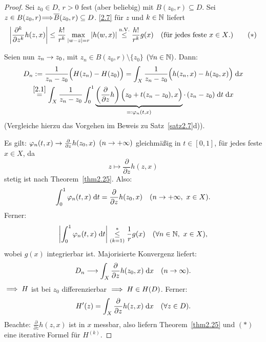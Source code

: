 \documentclass[a4paper,twoside,DIV15,BCOR12mm]{scrbook}
\begin{document}
\begin{proof} Sei $z_0\in D$, $r>0$ fest (aber beliebig) mit $B(z_0,r)\subseteq D$. Sei $z\in B(z_0,r)\!\!\!\implies\!\!\!\overline{B}(z_0,r)\subseteq D$. \eqref{2.7} für $z$ und $k\in\mathbb{N}$ liefert
\[\left\lvert\frac{\partial^k}{\partial z^k}h(z,x)\right\lvert\leq \frac{k!}{r^k}\max_{\left\lvert w-z\right\lvert=r}\left\lvert h(w,x)\right\lvert\overset{\text{n.V.}}{\leq}\frac{h!}{r^k}g(x)\quad\text{(für jedes feste $x\in X$.)}\tag{$*$}\]

Seien nun $z_n\rightarrow z_0$, mit $z_n\in B(z_0,r)\setminus\{z_0\}$ $(\forall n\in\mathbb{N})$. Dann:
\begin{gather*}
D_n:= \frac{1}{z_n-z_0}\Bigl(H(z_n)-H(z_0)\Bigr) = \int_{X}^{}{\frac{1}{z_n-z_0}\Bigl(h(z_n,x)-h(z_0,x)\Bigr)}\;\mathrm{d} x\\
\overset{\eqref{2.1}}{=}\int_{X}^{}{\frac{1}{z_n-z_0}\int_{0}^{1}{\underbrace{\left(\frac{\partial}{\partial z}h\right)\Bigl(z_0+t(z_n-z_0),x\Bigr)}_{=:\varphi_n(t,x)}\cdot\,(z_n-z_0)}\;\mathrm{d} t}\;\mathrm{d} x
\end{gather*}
(Vergleiche hierzu das Vorgehen im Beweis zu Satz~\ref{satz2.7}d)).

{Es gilt:} $\varphi_n(t,x)\rightarrow\frac{\partial}{\partial z}h(z_0,x)$ $(n\rightarrow+\infty)$ gleichmäßig in $t\in[0,1]$, für jedes feste $x\in X$, da
\[z\mapsto\frac{\partial}{\partial z}h(z,x)\]
stetig ist nach Theorem~\ref{thm2.25}. Also:
\[\int_{0}^{1}{\varphi_n(t,x)}\;\mathrm{d} t=\frac{\partial}{\partial z}h(z_0,x)\quad(n\rightarrow+\infty,\ x\in X).\]
Ferner:
\[\abs{\integral{0}{1}{\varphi_n(t,x)}{t}}\overset{*}{\underset{(k=1)}{\leq}}\frac{1}{r}g(x)\quad(\forall\nat{n},\ x\in X),\]
wobei $g(x)$ integrierbar ist.
Majorisierte Konvergenz liefert:
\[D_n\longrightarrow\int_{X}^{}{\frac{\partial}{\partial z}h(z_0,x)}\;\mathrm{d} x\quad(n\rightarrow\infty).\]
$\implies H$ ist bei $z_0$ differenzierbar $\implies H\in H(D)$. Ferner:
\[H^\prime(z) = \int_{X}^{}{\frac{\partial}{\partial z}h(z,x)}\;\mathrm{d} x\quad(\forall z\in D).\]
Beachte: $\frac{\partial}{\partial z}h(z,x)$ ist in $x$ messbar, also liefern Theorem~\ref{thm2.25} und $(*)$ eine iterative Formel für $H^{(k)}$.
\end{proof}
\end{document}
